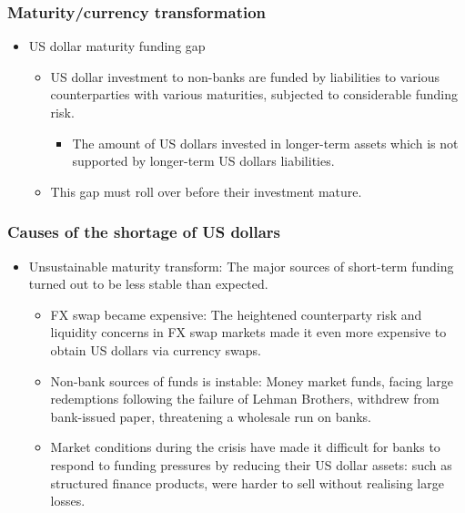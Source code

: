 \subsubsection{Maturity/currency transformation}
\begin{itemize}
\item US dollar maturity funding gap
  \begin{itemize}
  \item US dollar investment to non-banks are funded by liabilities to various counterparties with various maturities, subjected to considerable funding risk.
    \begin{itemize}
    \item The amount of US dollars invested in longer-term assets which is not supported by longer-term US dollars liabilities.
    \end{itemize}
    
  \item This gap must roll over before their investment mature.
  \end{itemize}
  
\end{itemize}



\subsubsection{Causes of the shortage of US dollars}
\begin{itemize}
\item Unsustainable maturity transform: The major sources of short-term funding turned out to be less stable than expected.
  \begin{itemize}
  \item FX swap became expensive: The heightened counterparty risk and liquidity concerns in FX swap markets made it even more expensive to obtain US dollars via currency swaps.
  \item Non-bank sources of funds is instable: Money market funds, facing large redemptions following the failure of Lehman Brothers, withdrew from bank-issued paper, threatening a wholesale run on banks.
  \item Market conditions during the crisis have made it difficult for banks to respond to funding pressures by reducing their US dollar assets: such as structured finance products, were harder to sell without realising large losses.
  \end{itemize}
\end{itemize}




